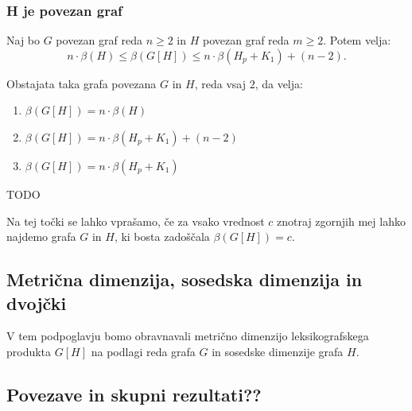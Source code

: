 \documentclass[mat1, tisk]{fmfdelo}
\begin{document}


\subsubsection{H je povezan graf} \label{sss:povzean}


\begin{izrek} \label{izrek:primeri_mdim_komp_povezan}
    Naj bo $G$ povezan graf reda $n \geq 2$ in $H$ povezan graf reda $m \geq 2$. Potem velja:
    $$
    n \cdot \beta(H)  
    \leq \beta(G[H]) \leq 
    n \cdot \beta(H_p + K_1) + (n-2). 
    $$
\end{izrek}

\begin{izrek} \label{izrek:omejitve_mdim_komp_povezan}
    Obstajata taka grafa povezana $G$ in $H$, reda vsaj $2$, da velja:
    \begin{enumerate}
        \item $\beta(G[H]) = n \cdot \beta(H)$
        \item $\beta(G[H]) = n \cdot \beta(H_p + K_1) + (n-2)$
        \item $\beta(G[H]) = n \cdot \beta(H_p + K_1)$
    \end{enumerate}
\end{izrek}
    
\begin{dokaz}
    TODO
\end{dokaz}

Na tej točki se lahko vprašamo, če za vsako vrednost $c$ znotraj zgornjih mej lahko najdemo
grafa $G$ in $H$, ki bosta zadoščala $\beta(G[H]) = c$.



\subsection{Metrična dimenzija, sosedska dimenzija in dvojčki}
V tem podpoglavju bomo obravnavali metrično dimenzijo leksikografskega produkta $G[H]$ na podlagi
reda grafa $G$ in sosedske dimenzije grafa $H$. 





\subsection{Povezave in skupni rezultati??}



\end{document}
